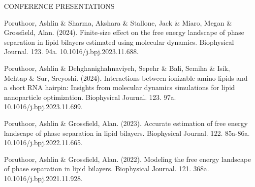 \documentclass{resume} %
\begin{document}
\begin{rSection}{CONFERENCE PRESENTATIONS}

   \item Poruthoor, Ashlin \& Sharma, Akshara \& Stallone, Jack \& Miaro, Megan \& Grossfield, Alan. (2024). Finite-size effect on the free energy landscape of phase separation in lipid bilayers estimated using molecular dynamics. Biophysical Journal. 123. 94a. 10.1016/j.bpj.2023.11.688.
   \item Poruthoor, Ashlin \& Dehghanighahnaviyeh, Sepehr \& Bali, Semiha \& Isik, Mehtap \& Sur, Sreyoshi. (2024). Interactions between ionizable amino lipids and a short RNA hairpin: Insights from molecular dynamics simulations for lipid nanoparticle optimization. Biophysical Journal. 123. 97a. 10.1016/j.bpj.2023.11.699.
   \item Poruthoor, Ashlin \& Grossfield, Alan. (2023). Accurate estimation of free energy landscape of phase separation in lipid bilayers. Biophysical Journal. 122. 85a-86a. 10.1016/j.bpj.2022.11.665.
   \item Poruthoor, Ashlin \& Grossfield, Alan. (2022). Modeling the free energy landscape of phase separation in lipid bilayers. Biophysical Journal. 121. 368a. 10.1016/j.bpj.2021.11.928.

\end{rSection}
\end{document}
